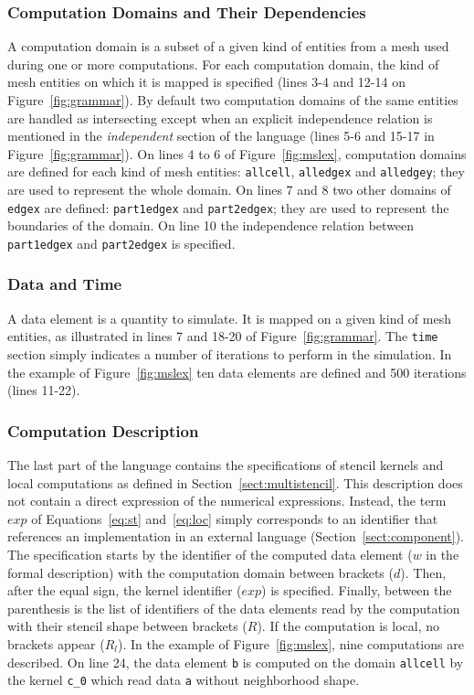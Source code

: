 \subsubsection*{Computation Domains and Their Dependencies}
A computation domain is a subset of a given kind of entities from a mesh used during one or more computations.
For each computation domain, the kind of mesh entities on which it is mapped is specified (lines 3-4 and 12-14 on Figure~\ref{fig:grammar}).
By default two computation domains of the same entities are handled as intersecting except when an explicit independence relation is mentioned in the \emph{independent} section of the language (lines 5-6 and 15-17 in Figure~\ref{fig:grammar}).
On lines 4 to 6 of Figure~\ref{fig:mslex}, computation domains are defined for each kind of mesh entities: \texttt{allcell}, \texttt{alledgex} and \texttt{alledgey}; they are used to represent the whole domain.
On lines 7 and 8 two other domains of \texttt{edgex} are defined: \texttt{part1edgex} and \texttt{part2edgex}; they are used to represent the boundaries of the domain.
On line 10 the independence relation between \texttt{part1edgex} and \texttt{part2edgex} is specified.

\subsubsection*{Data and Time}
A data element is a quantity to simulate. It is mapped on a given kind of mesh entities, as illustrated in lines 7 and 18-20 of Figure~\ref{fig:grammar}. The \texttt{time} section simply indicates a number of iterations to perform in the simulation. In the example of Figure~\ref{fig:mslex} ten data elements are defined and 500 iterations (lines 11-22). %


\subsubsection*{Computation Description}
The last part of the language contains the specifications of stencil kernels and local computations as defined in Section~\ref{sect:multistencil}.
This description does not contain a direct expression of the numerical expressions.
Instead, the term $exp$ of Equations~\ref{eq:st} and~\ref{eq:loc} simply corresponds to an identifier that references an implementation in an external language  (\cf Section~\ref{sect:component}).
The specification starts by the identifier of the computed data element ($w$ in the formal description) with the computation domain between brackets ($d$).
Then, after the equal sign, the kernel identifier ($exp$) is specified.
Finally, between the parenthesis is the list of identifiers of the data elements read by the computation with their stencil shape between brackets ($R$).
If the computation is local, no brackets appear ($R_l$). In the example of Figure~\ref{fig:mslex}, nine computations are described. On line 24, the data element \texttt{b} is computed on the domain \texttt{allcell} by the kernel \texttt{c\_0} which read data \texttt{a} without neighborhood shape.

